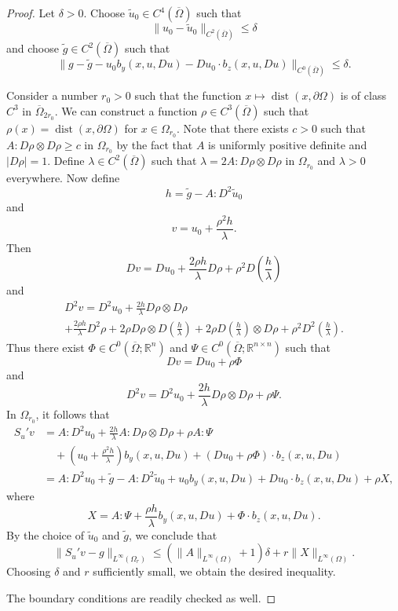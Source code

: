 \documentclass[a4paper]{article}
\newcommand{\R}{\mathbb{R}}
\DeclareMathOperator{\dist}{dist}
\theoremstyle{remark}
\begin{document}
\begin{proof}
Let $\delta > 0$.
Choose $\tilde{u}_0 \in C^4(\overline{\Omega})$ such that
\[
\|u_0 - \tilde{u}_0\|_{C^2(\overline{\Omega})} \le \delta
\]
and choose $\tilde{g} \in C^2(\overline{\Omega})$ such that
\[
\bigl\|g - \tilde{g} - u_0 b_y(x, u, Du) - Du_0 \cdot b_z(x, u, Du)\bigr\|_{C^0(\overline{\Omega})} \le \delta.
\]

Consider a number $r_0 > 0$ such that the function $x \mapsto \dist(x, \partial \Omega)$ is of class $C^3$
in $\overline{\Omega}_{2r_0}$. We can construct a function $\rho \in C^3(\overline{\Omega})$ such that
$\rho(x) = \dist(x, \partial \Omega)$ for $x \in \Omega_{r_0}$.
Note that there exists $c > 0$ such that $A : D\rho \otimes D\rho \ge c$ in $\Omega_{r_0}$ by the fact that
$A$ is uniformly positive definite and $|D\rho| = 1$. Define
$\lambda \in C^2(\overline{\Omega})$ such that
$\lambda = 2A : D\rho \otimes D\rho$ in $\Omega_{r_0}$ and $\lambda > 0$ everywhere. Now define
\[
h = \tilde{g} - A : D^2 \tilde{u}_0
\]
and
\[
v = u_0 + \frac{\rho^2 h}{\lambda}.
\]
Then
\[
Dv = Du_0 + \frac{2\rho h}{\lambda} D\rho + \rho^2 D\left(\frac{h}{\lambda}\right)
\]
and
\begin{multline*}
D^2 v = D^2 u_0 + \frac{2h}{\lambda} D\rho \otimes D\rho \\
+ \frac{2\rho h}{\lambda} D^2 \rho + 2\rho D\rho \otimes D\left(\frac{h}{\lambda}\right) + 2\rho D\left(\frac{h}{\lambda}\right) \otimes D\rho + \rho^2 D^2 \left(\frac{h}{\lambda}\right).
\end{multline*}
Thus there exist $\Phi \in C^0(\overline{\Omega}; \R^n)$ and $\Psi \in C^0(\overline{\Omega}; \R^{n \times n})$ such that
\[
Dv = Du_0 + \rho \Phi
\]
and
\[
D^2 v = D^2 u_0 + \frac{2h}{\lambda} D\rho \otimes D\rho + \rho \Psi.
\]
In $\Omega_{r_0}$, it follows that
\[
\begin{split}
S_u' v & = A : D^2u_0 + \frac{2h}{\lambda} A : D\rho \otimes D\rho + \rho A : \Psi \\
& \quad + \left(u_0 + \frac{\rho^2h}{\lambda}\right) b_y(x, u, Du) + \left(Du_0 + \rho \Phi\right) \cdot b_z(x, u, Du) \\
& = A : D^2 u_0 + \tilde{g} - A : D^2 \tilde{u}_0  + u_0 b_y(x, u, Du) + Du_0 \cdot b_z(x, u, Du) + \rho X,
\end{split}
\]
where
\[
X = A : \Psi + \frac{\rho h}{\lambda} b_y(x, u, Du) + \Phi \cdot b_z(x, u, Du).
\]
By the choice of $\tilde{u}_0$ and $\tilde{g}$, we conclude that
\[
\|S_u' v - g\|_{L^\infty(\Omega_r)} \le (\|A\|_{L^\infty(\Omega)} + 1) \delta + r\|X\|_{L^\infty(\Omega)}.
\]
Choosing $\delta$ and $r$ sufficiently small, we obtain the desired inequality.

The boundary conditions are readily checked as well.
\end{proof}
\end{document}
